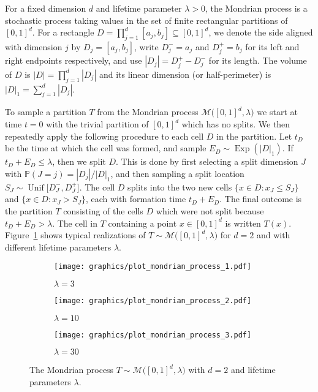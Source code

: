 \documentclass[11pt,lof]{puthesis}
\renewcommand{\P}{\ensuremath{\mathbb{P}}}
\newcommand{\cM}{\ensuremath{\mathcal{M}}}
\DeclareMathOperator{\Unif}{Unif}
\DeclareMathOperator{\Exp}{Exp}
\theoremstyle{break}
\theoremstyle{proof}
\begin{document}
For a fixed dimension $d$ and lifetime parameter $\lambda > 0$, the Mondrian
process is a stochastic process taking values in the set of finite rectangular
partitions of $[0,1]^d$. For a rectangle
$D = \prod_{j=1}^d [a_j, b_j] \subseteq [0,1]^d$,
we denote the side aligned with dimension $j$ by $D_j = [a_j, b_j]$, write
$D_j^- = a_j$ and $D_j^+ = b_j$ for its left and right endpoints respectively,
and use $|D_j| = D_j^+ - D_j^-$ for its length. The volume of $D$ is
$|D| = \prod_{j=1}^{d} |D_j|$ and its linear dimension (or half-perimeter) is
$|D|_1 = \sum_{j=1}^{d} |D_j|$.

To sample a partition $T$ from the Mondrian process
$\cM \big( [0,1]^d, \lambda \big)$ we start at time $t=0$ with the trivial
partition of $[0,1]^d$ which has no splits. We then repeatedly apply the
following procedure to each cell $D$ in the partition. Let $t_D$ be the time at
which the cell was formed, and sample $E_D \sim \Exp \left( |D|_1 \right)$. If
$t_D + E_D \leq \lambda$, then we split $D$. This is done by first selecting a
split dimension $J$ with $\P(J=j) = |D_j| / |D|_1$, and then sampling a split
location $S_J \sim \Unif\big[D_J^-, D_J^+\big]$. The cell $D$ splits into the
two new cells $\{x \in D : x_J \leq S_J\}$ and $\{x \in D : x_J > S_J\}$, each
with formation time $t_D + E_D$. The final outcome is the partition $T$
consisting of the cells $D$ which were not split because $t_D + E_D > \lambda$.
The cell in $T$ containing a point $x \in [0,1]^d$ is written $T(x)$.
Figure~\ref{fig:mondrian_process} shows typical realizations of
$T \sim \cM\big( [0,1]^d, \lambda \big)$ for $d=2$ and with different lifetime
parameters $\lambda$.
%
\begin{figure}[t]
  \centering
  \begin{subfigure}{0.32\textwidth}
    \centering
    \texttt{[image: graphics/plot\_mondrian\_process\_1.pdf]}
    \caption{$\lambda = 3$}
  \end{subfigure}
  \begin{subfigure}{0.32\textwidth}
    \centering
    \texttt{[image: graphics/plot\_mondrian\_process\_2.pdf]}
    \caption{$\lambda = 10$}
  \end{subfigure}
  \begin{subfigure}{0.32\textwidth}
    \centering
    \texttt{[image: graphics/plot\_mondrian\_process\_3.pdf]}
    \caption{$\lambda = 30$}
  \end{subfigure}
  \caption[The Mondrian process]{
    The Mondrian process $T \sim \cM \big( [0,1]^d, \lambda \big)$ with
  $d=2$ and lifetime parameters $\lambda$.}
  \label{fig:mondrian_process}
\end{figure}
\end{document}
